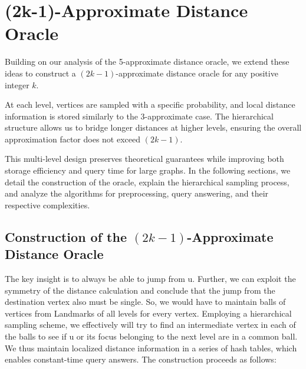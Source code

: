 \documentclass{article}
\begin{document}
\section{(2k-1)-Approximate Distance Oracle}

Building on our analysis of the 5-approximate distance oracle, we extend these ideas to construct a \((2k-1)\)-approximate distance oracle for any positive integer \(k\).

At each level, vertices are sampled with a specific probability, and local distance information is stored similarly to the 3-approximate case. The hierarchical structure allows us to bridge longer distances at higher levels, ensuring the overall approximation factor does not exceed \((2k-1)\).

This multi-level design preserves theoretical guarantees while improving both storage efficiency and query time for large graphs. In the following sections, we detail the construction of the oracle, explain the hierarchical sampling process, and analyze the algorithms for preprocessing, query answering, and their respective complexities.

\subsection{Construction of the \((2k-1)\)-Approximate Distance Oracle}

 The key insight is to always be able to jump from u. Further, we can exploit the symmetry of the distance calculation and conclude that the jump from the destination vertex also must be single. So, we would have to maintain balls of vertices from Landmarks of all levels for every vertex. Employing a hierarchical sampling scheme, we effectively will try to find an intermediate vertex in each of the balls to see if u or its focus belonging to the next level are in a common ball. We thus maintain localized distance information in a series of hash tables, which enables constant-time query answers. The construction proceeds as follows:
\end{document}
